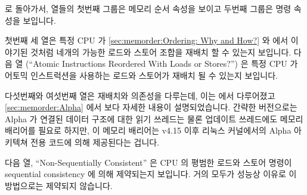 \fi

 로 돌아가서, 열들의 첫번째
그룹은 메모리 순서 속성을 보이고 두번째 그룹은 명령 속성을 보입니다.

첫번째 세 열은 특정 CPU 가
\cref{sec:memorder:Ordering: Why and How?} 와
에서 이야기된 것처럼 네개의 가능한 로드와 스토어 조합을 재배치 할 수 있는지
보입니다.
다음 열 (``Atomic Instructions Reordered With Loads or Stores?'') 은 특정 CPU
가 어토믹 인스트럭션을 사용하는 로드와 스토어가 재배치 될 수 있는지 보입니다.

다섯번째와 여섯번째 열은 재배치와 의존성을 다루는데, 이는
에서 다루어졌고
\cref{sec:memorder:Alpha} 에서 보다 자세한 내용이 설명되었습니다.
간략한 버전으로는 Alpha 가 연결된 데이터 구조에 대한 읽기 쓰레드는 물론
업데이트 쓰레드에도 메모리 배리어를 필요로 하지만, 이 메모리 배리어는 v4.15
이후 리눅스 커널에서의 Alpha 아키텍쳐 전용 코드에 의해 제공된다는 겁니다.

다음 열, ``Non-Sequentially Consistent'' 은 CPU 의 평범한 로드와 스토어 명령이
sequential consistency 에 의해 제약되는지 보입니다.
거의 모두가 성능상 이유로 이 방법으로는 제약되지 않습니다.

